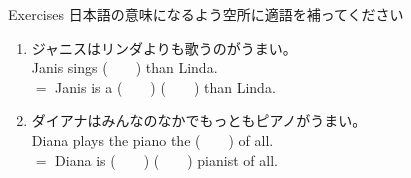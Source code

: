 \documentclass[aspectratio=169,xcolor={dvipsnames,table}]{beamer}
\begin{document}
\begin{frame}[plain]{Exercises}
日本語の意味になるよう空所に適語を補ってください%
\hfill{\scriptsize {}}
\begin{enumerate}
 \item ジャニスはリンダよりも歌うのがうまい。\\
       Janis sings (~~~~) than Linda.\\
       $=$\,\,Janis is a  (~~~~)  (~~~~) than Linda.
 \item ダイアナはみんなのなかでもっともピアノがうまい。\\
       Diana plays the piano the (~~~~) of all.\\
       $=$\,\,Diana is (~~~~)  (~~~~) pianist of all.
\end{enumerate}
\end{frame}
\end{document}
